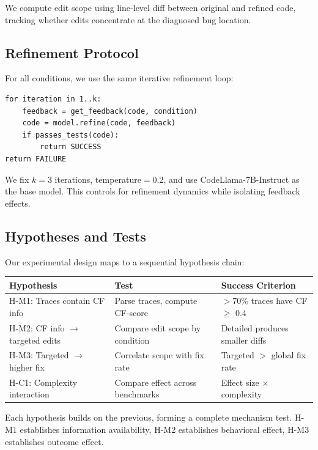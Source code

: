 We compute edit scope using line-level diff between original and refined code, tracking whether edits concentrate at the diagnosed bug location.

\subsection{Refinement Protocol}

For all conditions, we use the same iterative refinement loop:

\begin{verbatim}
for iteration in 1..k:
    feedback = get_feedback(code, condition)
    code = model.refine(code, feedback)
    if passes_tests(code):
        return SUCCESS
return FAILURE
\end{verbatim}

We fix $k=3$ iterations, temperature$=$0.2, and use CodeLlama-7B-Instruct as the base model. This controls for refinement dynamics while isolating feedback effects.

\subsection{Hypotheses and Tests}

Our experimental design maps to a sequential hypothesis chain:

\begin{table}[h]
\centering
\begin{tabular}{@{}lll@{}}
\toprule
\textbf{Hypothesis} & \textbf{Test} & \textbf{Success Criterion} \\
\midrule
H-M1: Traces contain CF info & Parse traces, compute CF-score & $>$70\% traces have CF $\geq$ 0.4 \\
H-M2: CF info $\rightarrow$ targeted edits & Compare edit scope by condition & Detailed produces smaller diffs \\
H-M3: Targeted $\rightarrow$ higher fix & Correlate scope with fix rate & Targeted $>$ global fix rate \\
H-C1: Complexity interaction & Compare effect across benchmarks & Effect size $\times$ complexity \\
\bottomrule
\end{tabular}
\end{table}

Each hypothesis builds on the previous, forming a complete mechanism test. H-M1 establishes information availability, H-M2 establishes behavioral effect, H-M3 establishes outcome effect.

